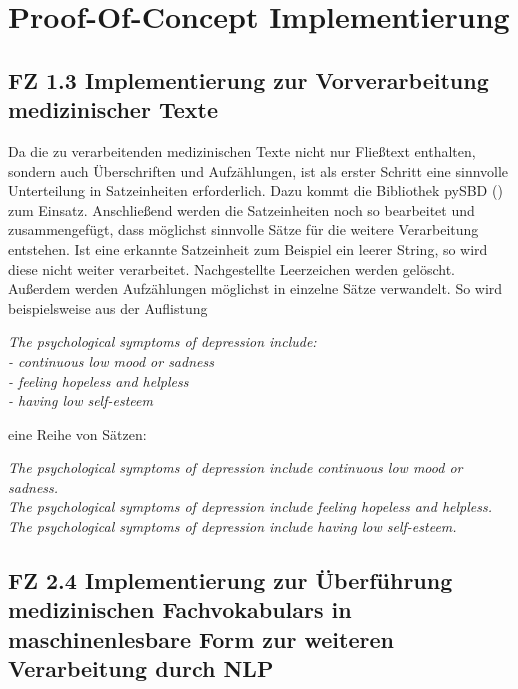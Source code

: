 \chapter{Proof-Of-Concept Implementierung}
\label{ch:implementierung}


\section{FZ 1.3 Implementierung zur Vorverarbeitung medizinischer Texte}
\label{sec:FZ1.3} 

Da die zu verarbeitenden medizinischen Texte nicht nur Fließtext enthalten, sondern auch Überschriften und Aufzählungen, ist als erster Schritt eine sinnvolle Unterteilung in Satzeinheiten erforderlich. Dazu kommt die Bibliothek pySBD (\cite{sadvilkar_pysbd_2020}) zum Einsatz. Anschließend werden die Satzeinheiten noch so bearbeitet und zusammengefügt, dass möglichst sinnvolle Sätze für die weitere Verarbeitung entstehen. Ist eine erkannte Satzeinheit zum Beispiel ein leerer String, so wird diese nicht weiter verarbeitet. Nachgestellte Leerzeichen werden gelöscht. Außerdem werden Aufzählungen möglichst in einzelne Sätze verwandelt. So wird beispielsweise aus der Auflistung\\
\begin{addmargin}{10pt}
\emph{
	The psychological symptoms of depression include:\\
	- continuous low mood or sadness\\
	- feeling hopeless and helpless\\
	- having low self-esteem
}
\end{addmargin}
\vspace*{5mm}
eine Reihe von Sätzen:\\
\begin{addmargin}{10pt}
\emph{
	The psychological symptoms of depression include continuous low mood or sadness.\\
	The psychological symptoms of depression include feeling hopeless and helpless.\\
	The psychological symptoms of depression include having low self-esteem.
}
\end{addmargin}
\vspace*{5mm}
\section{FZ 2.4 Implementierung zur Überführung medizinischen Fachvokabulars in maschinenlesbare Form zur weiteren Verarbeitung durch NLP}
\label{sec:FZ2.4}

